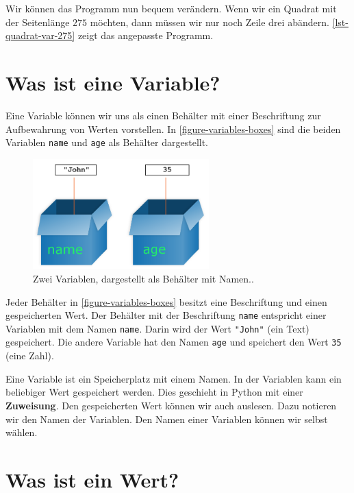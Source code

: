 Wir können das Programm nun bequem verändern. Wenn wir ein Quadrat mit der Seitenlänge $275$ möchten, dann müssen wir nur noch Zeile drei abändern. \autoref{lst-quadrat-var-275} zeigt das angepasste Programm.

\section{Was ist eine Variable?}

Eine Variable können wir uns als einen Behälter mit einer Beschriftung zur Aufbewahrung von Werten vorstellen. In \autoref{figure-variables-boxes} sind die beiden Variablen \lstinline{name} und \lstinline{age} als Behälter dargestellt.

\begin{figure}[htb]
\centering
\includegraphics[height=4.25cm]{boxesVariable}
\caption{Zwei Variablen, dargestellt als Behälter mit Namen.\protect\footnotemark.}
\label{figure-variables-boxes}
\end{figure}


Jeder Behälter in \autoref{figure-variables-boxes} besitzt eine Beschriftung und einen gespeicherten Wert. Der Behälter mit der Beschriftung \lstinline{name} entspricht einer Variablen mit dem Namen \lstinline{name}. Darin wird der Wert \lstinline{"John"} (ein Text) gespeichert. Die andere Variable hat den Namen \lstinline{age} und speichert den Wert \lstinline{35} (eine Zahl).

\begin{definition}[Variable]
Eine Variable ist ein Speicherplatz mit einem Namen. In der Variablen kann ein beliebiger Wert gespeichert werden. Dies geschieht in Python mit einer \textbf{Zuweisung}. Den gespeicherten Wert können wir auch auslesen. Dazu notieren wir den Namen der Variablen. Den Namen einer Variablen können wir selbst wählen.
\end{definition}

\section{Was ist ein Wert?}

